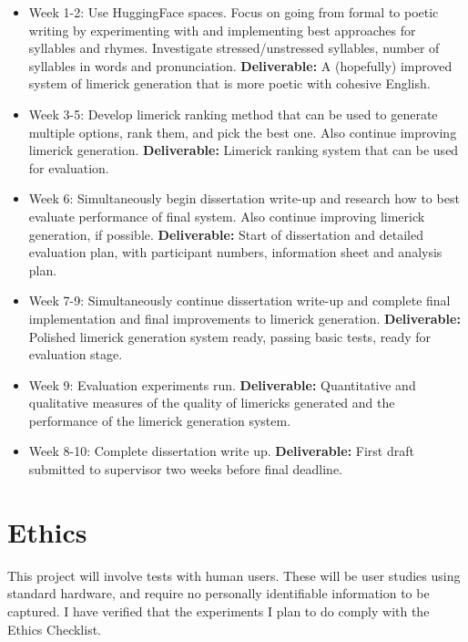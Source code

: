 \documentclass[11pt]{article}
\begin{document}
\begin{itemize}
    \tightlist
    \item
      Week 1-2: Use HuggingFace spaces. Focus on going from formal to poetic writing by experimenting with and implementing best approaches for syllables and rhymes. Investigate stressed/unstressed syllables, number of syllables in words and pronunciation.
      \textbf{Deliverable:} A (hopefully) improved system of limerick generation that is more poetic with cohesive English.
    \item
      Week 3-5: Develop limerick ranking method that can be used to generate multiple options, rank them, and pick the best one. Also continue improving limerick generation.
      \textbf{Deliverable:} Limerick ranking system that can be used for evaluation.
    \item
      Week 6: Simultaneously begin dissertation write-up and research how to best evaluate performance of final system. Also continue improving limerick generation, if possible.
      \textbf{Deliverable:} Start of dissertation and detailed evaluation plan, with participant numbers, information sheet and analysis plan.
    \item
      Week 7-9: Simultaneously continue dissertation write-up and complete final implementation and final improvements to limerick generation.
      \textbf{Deliverable:} Polished limerick generation system ready, passing basic tests, ready for evaluation stage.
    \item
      Week 9: Evaluation experiments run.
      \textbf{Deliverable:} Quantitative and qualitative measures of the quality of limericks generated and the performance of the limerick generation system.
    \item
      Week 8-10: Complete dissertation write up.
      \textbf{Deliverable:} First draft submitted to supervisor two weeks before final deadline.
    \end{itemize}
    

\section{Ethics}

This project will involve tests with human users.  These will be user studies
using standard hardware, and require no personally identifiable information to be captured.
I have verified that the experiments I plan to do comply with the Ethics Checklist.
\end{document}
